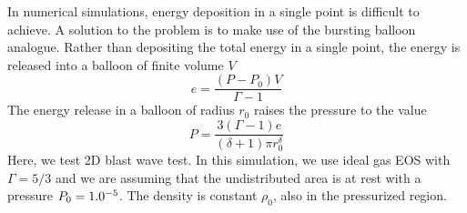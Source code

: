 \documentclass[notes.tex]{subfiles}
\begin{document}
In numerical simulations, energy deposition in a single point is difficult to achieve. A solution to the problem is to make use of the bursting balloon analogue. Rather than depositing the total energy in a single point, the energy is released into a balloon of finite volume $V$
\begin{equation}
e = \frac{(P-P_0)V}{\Gamma -1}
\end{equation}
The energy release in a balloon of radius $r_0$ raises the pressure to the value
\begin{equation}
P = \frac{3(\Gamma-1)e}{(\delta+1) \pi r_0^{\delta}}
\end{equation}
Here, we test 2D blast wave test. In this simulation, we use ideal gas EOS with $\Gamma = 5/3$ and we are assuming that the undistributed area is at rest with a pressure $P_0 = 1.0 \time 10^{-5}$. The density is constant $\rho_0$, also in the pressurized region.
\end{document}
